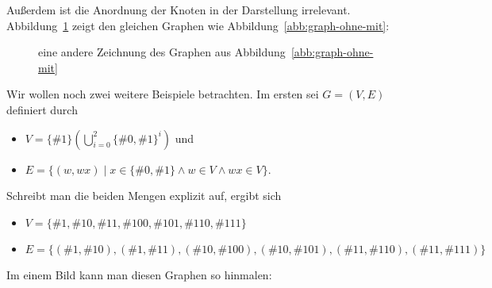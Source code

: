 Außerdem ist die Anordnung der Knoten in der Darstellung irrelevant.
Abbildung~\ref{abb:graph-mit-2} zeigt den gleichen Graphen wie
Abbildung~\ref{abb:graph-ohne-mit}:

\begin{figure}[ht] \centering
  \caption{eine andere Zeichnung des Graphen aus
Abbildung~\ref{abb:graph-ohne-mit}}
  \label{abb:graph-mit-2}
\end{figure}

\noindent Wir wollen noch zwei weitere Beispiele betrachten.
% 
Im ersten sei $G=(V,E)$ definiert durch
\begin{itemize}
\item $V=\{\#1\}\left(\bigcup_{i=0}^2 \{\#0,\#1\}^i\right)$ und
\item $E=\{ (w,wx) \mid x\in \{\#0,\#1\}\land w\in V \land wx\in V
\}$.
\end{itemize}
% 
Schreibt man die beiden Mengen explizit auf, ergibt sich
\begin{itemize}
\item $V = \{ \#1, \#{10}, \#{11}, \#{100}, \#{101}, \#{110}, \#{111}
\}$
\item $E = \{ (\#1,\#{10}), (\#1,\#{11}), (\#{10},\#{100}),
(\#{10},\#{101}), (\#{11},\#{110}), (\#{11},\#{111}) \}$
\end{itemize}
% 
Im einem Bild kann man diesen Graphen so hinmalen:

